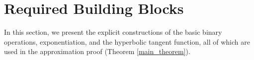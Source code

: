 \documentclass{article}
\newcommand{\fr}{\frac}
\newtheorem{lem}{Lemma}
\numberwithin{Def}{section}
\newcommand{\R}{\mathbb R}
\begin{document}

\section{Required Building Blocks}
\label{sec:basicBuildingBlocks}
In this section, we present the explicit constructions of the basic binary operations, exponentiation, and the hyperbolic tangent function, all of which are used in the approximation proof (Theorem \ref{main_theorem}).
\end{document}
